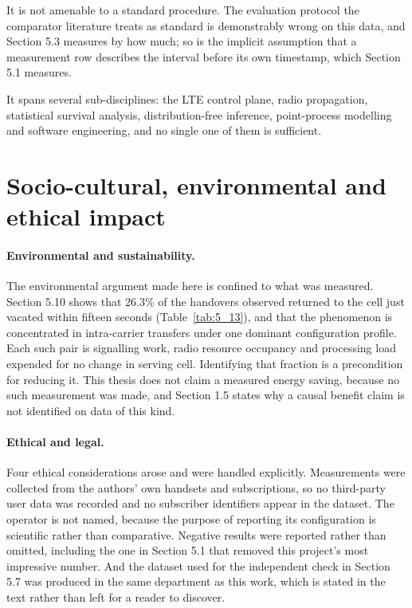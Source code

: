 It is not amenable to a standard procedure. The evaluation protocol the comparator literature treats as standard is demonstrably wrong on this data, and Section 5.3 measures by how much; so is the implicit assumption that a measurement row describes the interval before its own timestamp, which Section 5.1 measures.

It spans several sub-disciplines: the LTE control plane, radio propagation, statistical survival analysis, distribution-free inference, point-process modelling and software engineering, and no single one of them is sufficient.


\section{Socio-cultural, environmental and ethical impact}
\label{sec:6_6}

\paragraph{Environmental and sustainability.} The environmental argument made here is confined to what was measured. Section 5.10 shows that 26.3\% of the handovers observed returned to the cell just vacated within fifteen seconds (Table~\ref{tab:5_13}), and that the phenomenon is concentrated in intra-carrier transfers under one dominant configuration profile. Each such pair is signalling work, radio resource occupancy and processing load expended for no change in serving cell. Identifying that fraction is a precondition for reducing it. This thesis does not claim a measured energy saving, because no such measurement was made, and Section 1.5 states why a causal benefit claim is not identified on data of this kind.

\paragraph{Ethical and legal.} Four ethical considerations arose and were handled explicitly. Measurements were collected from the authors' own handsets and subscriptions, so no third-party user data was recorded and no subscriber identifiers appear in the dataset. The operator is not named, because the purpose of reporting its configuration is scientific rather than comparative. Negative results were reported rather than omitted, including the one in Section 5.1 that removed this project's most impressive number. And the dataset used for the independent check in Section 5.7 was produced in the same department as this work, which is stated in the text rather than left for a reader to discover.


